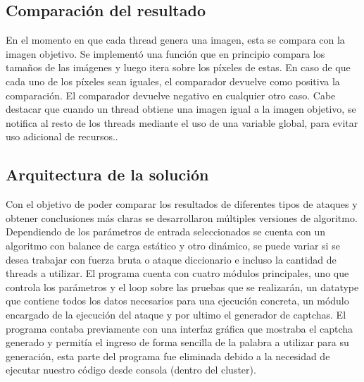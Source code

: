 \documentclass[conference]{IEEEtran}
\begin{document}
\subsection{Comparación del resultado}
En el momento en que cada thread genera una imagen, esta se compara con la imagen objetivo. Se implementó una función que en principio compara los tamaños de las imágenes y luego itera sobre los píxeles de estas. En caso de que cada uno de los píxeles sean iguales, el comparador devuelve como positiva la comparación. El comparador devuelve negativo en cualquier otro caso. Cabe destacar que cuando un thread obtiene una imagen igual a la imagen objetivo, se notifica al resto de los threads mediante el uso de una variable global, para evitar uso adicional de recursos.. 
\subsection{Arquitectura de la solución}

Con el objetivo de poder comparar los resultados de diferentes tipos de ataques y obtener conclusiones más claras se desarrollaron múltiples versiones de algoritmo.\newline
Dependiendo de los parámetros de entrada seleccionados se 
cuenta con un algoritmo con balance de carga estático y otro dinámico, se puede variar si se desea trabajar con fuerza bruta o ataque diccionario e incluso la cantidad de threads a utilizar.
El programa cuenta con cuatro módulos principales, uno que controla los parámetros y el loop sobre las pruebas que se realizarán, un datatype que contiene todos los datos necesarios para una ejecución concreta, un módulo encargado de la ejecución del ataque y por ultimo el generador de captchas. 
El programa contaba previamente con una interfaz gráfica que mostraba el captcha generado y permitía el ingreso de forma sencilla de la palabra a utilizar para su generación, esta parte del programa fue eliminada debido a la necesidad de ejecutar nuestro código desde consola (dentro del cluster).
\end{document}
